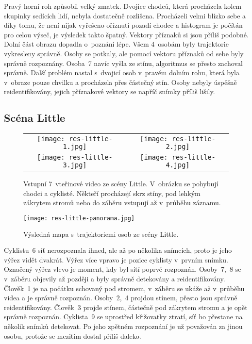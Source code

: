 Pravý horní roh způsobil velký zmatek. Dvojice chodců, která procházela kolem skupinky sedících lidí, nebyla dostatečně rozlišena. Procházeli velmi blízko sebe a díky tomu, že není nijak vyřešeno oříznutí pozadí chodce a histogram je počítán pro celou výseč, je výsledek takto špatný. Vektory příznaků si jsou příliš podobné. Dolní část obrazu dopadla o~poznání lépe. Všem 4~osobám byly trajektorie vykresleny správně. Osoby se potkaly, ale pomocí vektoru příznaků od sebe byly správně rozpoznány. Osoba~7 navíc vyšla ze stínu, algoritmus se přesto zachoval správně. Další problém nastal s~dvojicí osob v~pravém dolním rohu, která byla v~obraze pouze chvilku a procházela přes částečný stín. Osoby nebyly úspěšně reidentifikovány, jejich příznakové vektory se napříč snímky příliš lišily.


\subsection*{Scéna Little}

\begin{figure}[H]
    \begin{tabular}{cc}
        \texttt{[image: res-little-1.jpg]} &
        \texttt{[image: res-little-2.jpg]} \\
        \texttt{[image: res-little-3.jpg]} &
        \texttt{[image: res-little-4.jpg]} \\
    \end{tabular}
    \caption[Otestování algoritmu na scéně Little]{Vstupní 7~vteřinové video ze scény Little. V~obrázku se pohybují chodci a cyklisté. Někteří procházejí skrz stíny, pod lehkým zákrytem stromů nebo do záběru vstupují až v~průběhu záznamu.}
\end{figure}

\begin{figure}[H]
    \centering
    \texttt{[image: res-little-panorama.jpg]}
    \caption[Výsledná mapa s~trajektoriemi osob ze scény Little]{Výsledná mapa s~trajektoriemi osob ze scény Little.}
\end{figure}

Cyklistu~6 síť nerozpoznala ihned, ale až po několika snímcích, proto je jeho výřez vidět dvakrát. Výřez více vpravo je pozice cyklisty v~prvním snímku. Označený výřez vlevo je moment, kdy byl sítí poprvé rozpoznán. Osoby~7,~8 se v~záběru objevily až později a byly správně detekovány a reidentifikovány. Člověk~1 je na počátku schovaný pod stromem, v~záběru se ukáže až v~průběhu videa a je správně rozpoznán. Osoby~2,~4 projdou stínem, přesto jsou správně reidentifikovány. Člověk~3 projde stínem, částečně pod zákrytem stromu a je opět správně rozpoznán. Cyklista~9 se uprostřed křižovatky ztratí, síť ho přestane na několik snímků detekovat. Po jeho zpětném rozpoznání je už považován za jinou osobu, protože se mezitím dostal příliš daleko.

